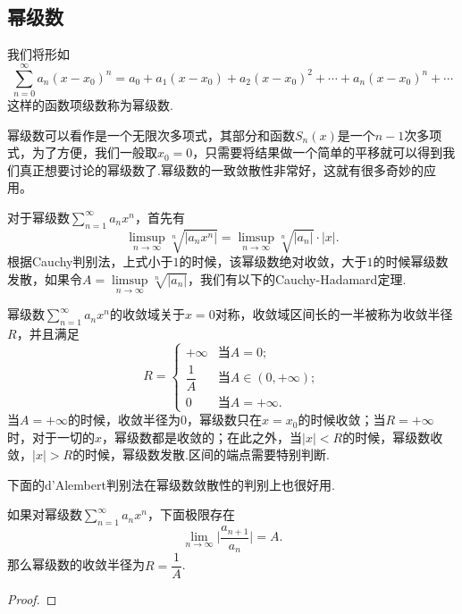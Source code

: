 \subsection{幂级数}

\begin{definition}[幂级数]
    我们将形如\[\sum_{n=0}^{\infty}a_n(x-x_0)^n=a_0+a_1(x-x_0)+a_2(x-x_0)^2+\cdots+a_n(x-x_0)^n+\cdots\]
    这样的函数项级数称为{\heiti 幂级数}.
\end{definition}

幂级数可以看作是一个无限次多项式，其部分和函数\(S_n(x)\)是一个\(n-1\)次多项式，为了方便，我们一般取\(x_0=0\)，只需要将结果做一个简单的平移就可以得到我们真正想要讨论的幂级数了.幂级数的一致敛散性非常好，这就有很多奇妙的应用。

对于幂级数\(\sum\limits_{n=1}^{\infty}a_nx^n\)，首先有\[\limsup_{n\to\infty}\sqrt[n]{\lvert a_nx^n\rvert}=\limsup_{n\to\infty}\sqrt[n]{\lvert a_n\rvert}\cdot\lvert x\rvert.\]根据Cauchy判别法，上式小于\(1\)的时候，该幂级数绝对收敛，大于\(1\)的时候幂级数发散，如果令\(A=\limsup\limits_{n\to\infty}\sqrt[n]{\lvert a_n\rvert}\)，我们有以下的Cauchy-Hadamard定理.

\begin{theorem}
    幂级数\(\sum\limits_{n=1}^{\infty}a_nx^n\)的收敛域关于\(x=0\)对称，收敛域区间长的一半被称为{\heiti 收敛半径}\(R\)，并且满足\[R=\begin{cases}
        +\infty &\text{当}A=0;\\
        \dfrac{1}{A} &\text{当}A\in (0,+\infty);\\
        0 &\text{当}A=+\infty.
    \end{cases}\]当\(A=+\infty\)的时候，收敛半径为\(0\)，幂级数只在\(x=x_0\)的时候收敛；当\(R=+\infty\)时，对于一切的\(x\)，幂级数都是收敛的；在此之外，当\(\lvert x\rvert<R\)的时候，幂级数收敛，\(\lvert x\rvert>R\)的时候，幂级数发散.区间的端点需要特别判断.
\end{theorem}

下面的d'Alembert判别法在幂级数敛散性的判别上也很好用.
\begin{theorem}[d'Alembert判别法]
    如果对幂级数\(\sum\limits_{n=1}^{\infty}a_nx^n\)，下面极限存在\[\lim_{n\to\infty}\lvert \frac{a_{n+1}}{a_n}\rvert = A.\]
    那么幂级数的收敛半径为\(R=\dfrac{1}{A}\).
\end{theorem}
\begin{proof}
    
\end{proof}

\begin{theorem}[Abel第二定理]

\end{theorem}

